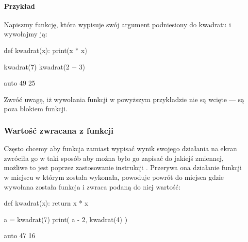 \paragraph{Przykład}
Napiszmy funkcję, która wypisuje swój argument podniesiony do kwadratu i wywołajmy ją:

\begin{CodeFrame}[python]{.5\textwidth}
def kwadrat(x):
  print(x * x)

kwadrat(7)
kwadrat(2 + 3)
\end{CodeFrame}
\begin{CodeFrame}{auto}
49
25
\end{CodeFrame}

\noindent
Zwróć uwagę, iż wywołania funkcji w powyższym przykładzie nie są wcięte --- są poza blokiem funkcji.


\subsubsection{Wartość zwracana z funkcji}

Często chcemy aby funkcja zamiast wypisać wynik swojego działania na ekran zwróciła go w taki sposób aby można było go zapisać do jakiejś zmiennej,
możliwe to jest poprzez zastosowanie instrukcji . Przerywa ona działanie funkcji w miejscu w którym została wykonała,
powoduje powrót do miejsca gdzie wywołana została funkcja i zwraca podaną do niej wartość:

\begin{CodeFrame}[python]{.5\textwidth}
def kwadrat(x):
  return x * x

a = kwadrat(7)
print( a - 2, kwadrat(4) )
\end{CodeFrame}
\begin{CodeFrame}{auto}
47 16
\end{CodeFrame}

